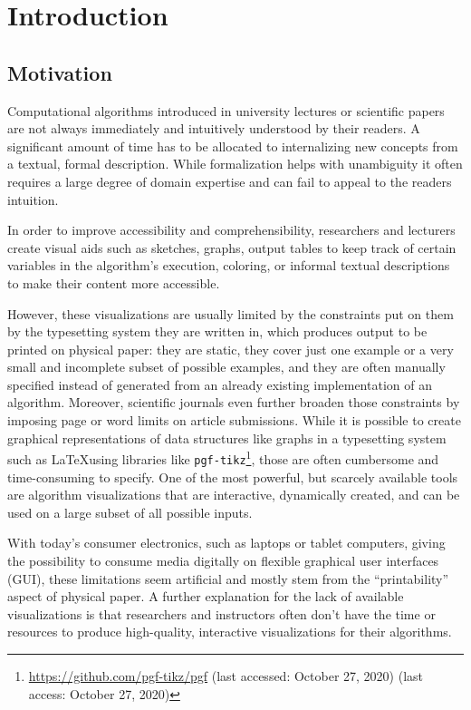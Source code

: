 \section{Introduction}

\subsection{Motivation}

Computational algorithms introduced in university lectures or scientific papers are not always immediately and intuitively understood by their readers.
A significant amount of time has to be allocated to internalizing new concepts from a textual, formal description. While formalization helps with unambiguity it often requires a large degree of domain expertise and can fail to appeal to the readers intuition.

In order to improve accessibility and comprehensibility, researchers and lecturers create visual aids such as sketches, graphs, output tables to keep track of certain variables in the algorithm's execution, coloring, or informal textual descriptions to make their content more accessible. 

However, these visualizations are usually limited by the constraints put on them by the typesetting system they are written in, which produces output to be printed on physical paper: they are static, they cover just one example or a very small and incomplete subset of possible examples, and they are often manually specified instead of generated from an already existing implementation of an algorithm. Moreover, scientific journals even further broaden those constraints by imposing page or word limits on article submissions. While it is possible to create graphical representations of data structures like graphs in a typesetting system such as \LaTeX using libraries like \texttt{pgf-tikz}\footnote{\url{https://github.com/pgf-tikz/pgf} (last accessed: October 27, 2020) (last access: October 27, 2020)}, those are often cumbersome and time-consuming to specify.
One of the most powerful, but scarcely available tools are algorithm visualizations that are interactive, dynamically created, and can be used on a large subset of all possible inputs. 



With today's consumer electronics, such as laptops or tablet computers, giving the possibility to consume media digitally on flexible graphical user interfaces (GUI), these limitations seem artificial and mostly stem from the ``printability'' aspect of physical paper. A further explanation for the lack of available visualizations is that researchers and instructors often don't have the time or resources to produce high-quality, interactive visualizations for their algorithms.

